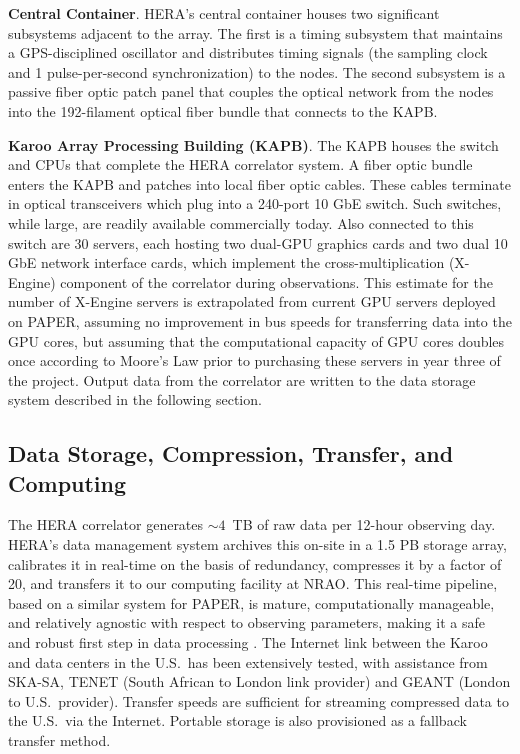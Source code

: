 \documentclass[preprint,11pt]{aastex}
\begin{document}
{\bf Central Container}.
HERA's central container houses two significant subsystems adjacent to the array.  The first is a timing subsystem
that maintains a GPS-disciplined oscillator and distributes timing
signals (the sampling clock and 1 pulse-per-second synchronization) to the nodes.  The second
subsystem is a passive fiber optic patch panel that couples
the optical network from the nodes into the 192-filament optical fiber bundle 
that connects to the KAPB. 

{\bf Karoo Array Processing Building (KAPB)}.
The KAPB houses the switch and CPUs
that 
complete the HERA correlator system.  A fiber optic bundle enters the KAPB and patches
into local fiber optic cables. These cables terminate in optical transceivers which plug into a 240-port 10 GbE switch.
Such switches, while large, are readily available commercially today.  Also connected to
this switch are 30 servers, each hosting two dual-GPU graphics cards and two dual
10 GbE network interface cards, which implement the cross-multiplication (X-Engine) component
of the correlator during observations.  This estimate for the number of X-Engine servers
is extrapolated from current GPU servers deployed on PAPER, assuming no improvement in bus
speeds for transferring data into the GPU cores, but assuming that the computational
capacity of GPU cores doubles once according to Moore's Law prior to purchasing
these servers in year three of the project.
Output data from the correlator are written to the data storage system described
in the following section.

\vspace{-20pt}
\subsection{Data Storage, Compression, Transfer, and Computing}
\label{sec:data}
\vspace{-5pt}
\noindent The HERA correlator generates $\sim4$~TB of raw data per 12-hour observing day.
HERA's data management system archives this on-site in a 1.5 PB storage array, calibrates it in real-time
on the basis of redundancy, compresses it by a factor of 20, and transfers it to our computing facility at NRAO.
This real-time pipeline, based on a similar system for PAPER, is mature, computationally manageable, and 
relatively agnostic with respect to observing parameters, making it a safe and robust first step in data processing
\citep{zheng_et_al2014,parsons_et_al2014,ali_et_al2015}.
The Internet link between the Karoo and data centers in the U.S.\ has been extensively tested, with assistance from SKA-SA, TENET
(South African to London link provider) and GEANT (London to U.S.\ provider).   
Transfer speeds are sufficient for streaming compressed data to the U.S.\ via the Internet. Portable storage is also
provisioned as a fallback transfer method.
\end{document}
